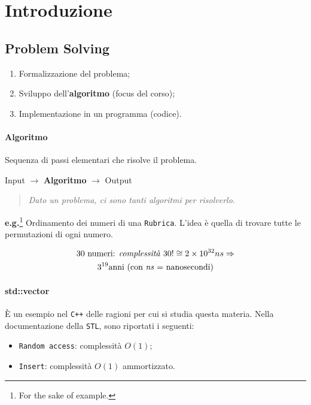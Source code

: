 \section{Introduzione}

\subsection{Problem Solving}
\begin{enumerate}
	\item Formalizzazione del problema;
	\item Sviluppo dell'\textbf{algoritmo} (focus del corso);
	\item Implementazione in un programma (codice).
\end{enumerate}

\paragraph{Algoritmo} Sequenza di passi elementari che risolve il problema.\par

\begin{center}
	Input $\rightarrow$ \textbf{Algoritmo} $\rightarrow$ Output
\end{center}

\begin{quote} 
	\textit{Dato un problema, ci sono tanti algoritmi per risolverlo.}
\end{quote}

\noindent \textbf{e.g.}\footnote{For the sake of example.} Ordinamento dei numeri di una \texttt{Rubrica}.
L'idea è quella di trovare tutte le permutazioni di ogni numero.\par
\begin{gather*}
	\text{30 numeri: \textit{complessità} } 30! \cong 2 \times 10^{32}ns \Rightarrow \\
	3^{19} \text{anni (con \textit{ns} = nanosecondi)}
\end{gather*}

\paragraph{std::vector} È un esempio nel \texttt{C++} delle ragioni per cui 
si studia questa materia. Nella documentazione della \texttt{STL}, 
sono riportati i seguenti:

\begin{itemize}
	\item \texttt{Random access}: complessità $O(1)$;
	\item \texttt{Insert}: complessità $O(1)$ ammortizzato.
\end{itemize}

